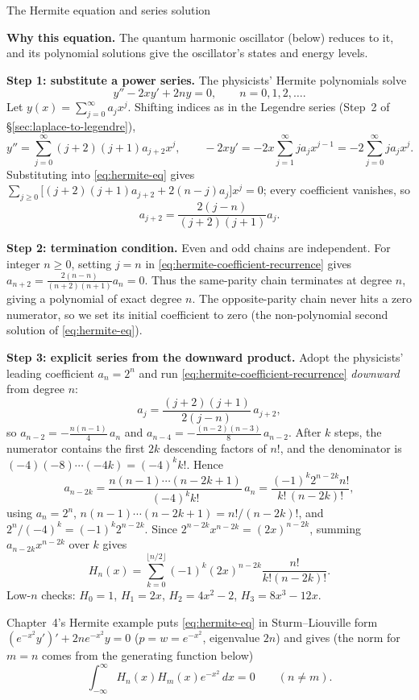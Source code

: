 \documentclass[11pt]{beamer}
\begin{document}
\begin{frame}[allowframebreaks=1.00]{The Hermite equation and series solution}
\footnotesize

\textbf{Why this equation.} The quantum harmonic oscillator (below) reduces to it,
and its polynomial solutions give the oscillator's states and energy levels.

\textbf{Step 1: substitute a power series.}  The physicists' Hermite polynomials solve
\begin{equation}
  y''-2xy'+2ny=0,
  \qquad n=0,1,2,\ldots.
  \label{eq:hermite-eq}
\end{equation}
Let $y(x)=\sum_{j=0}^{\infty}a_jx^j$.  Shifting indices as in the Legendre series (Step~2 of
\S\ref{sec:laplace-to-legendre}),
\[
  y''=\sum_{j=0}^{\infty}(j+2)(j+1)a_{j+2}x^j,
  \qquad
  -2xy'=-2x\sum_{j=1}^{\infty}ja_jx^{j-1}=-2\sum_{j=0}^{\infty}ja_jx^j .
\]
Substituting into \eqref{eq:hermite-eq} gives
$\sum_{j\ge0}\bigl[(j+2)(j+1)a_{j+2}+2(n-j)a_j\bigr]x^j=0$; every coefficient vanishes, so
\begin{equation}
  a_{j+2}=\frac{2(j-n)}{(j+2)(j+1)}a_j.
  \label{eq:hermite-coefficient-recurrence}
\end{equation}

\textbf{Step 2: termination condition.}  Even and odd chains are independent.  For integer
$n\ge0$, setting $j=n$ in \eqref{eq:hermite-coefficient-recurrence} gives
$a_{n+2}=\tfrac{2(n-n)}{(n+2)(n+1)}a_n=0$. Thus the same-parity chain terminates at degree $n$, giving a polynomial of exact degree
$n$.  The opposite-parity chain never hits a zero numerator, so we set its initial
coefficient to zero (the non-polynomial second solution of \eqref{eq:hermite-eq}).

\textbf{Step 3: explicit series from the downward product.}
Adopt the physicists' leading coefficient $a_n=2^n$ and run
\eqref{eq:hermite-coefficient-recurrence} \emph{downward} from degree $n$:
\[
  a_j=\frac{(j+2)(j+1)}{2(j-n)}\,a_{j+2},
\]
so $a_{n-2}=-\tfrac{n(n-1)}{4}\,a_n$ and $a_{n-4}=-\tfrac{(n-2)(n-3)}{8}\,a_{n-2}$. After $k$ steps, the numerator
contains the first $2k$ descending factors of $n!$, and the denominator is
$(-4)(-8)\cdots(-4k)=(-4)^k k!$. Hence
\[
 a_{n-2k}=\frac{n(n-1)\cdots(n-2k+1)}{(-4)^k k!}\,a_n
 =\frac{(-1)^k2^{n-2k}n!}{k!\,(n-2k)!},
\]
using $a_n=2^n$, $n(n-1)\cdots(n-2k+1)=n!/(n-2k)!$, and $2^n/(-4)^k=(-1)^k2^{n-2k}$.
Since $2^{n-2k}x^{n-2k}=(2x)^{n-2k}$, summing $a_{n-2k}x^{n-2k}$ over $k$ gives
\begin{equation}
  H_n(x)=\sum_{k=0}^{\lfloor n/2\rfloor}
  (-1)^k(2x)^{n-2k}\frac{n!}{k!(n-2k)!}.
  \label{eq:hermite-series}
\end{equation}
Low-$n$ checks: $H_0=1$, $H_1=2x$, $H_2=4x^2-2$, $H_3=8x^3-12x$.

Chapter~4's Hermite example puts \eqref{eq:hermite-eq} in Sturm--Liouville form
$(e^{-x^2}y')'+2ne^{-x^2}y=0$ ($p=w=e^{-x^2}$, eigenvalue $2n$) and gives
(the norm for $m=n$ comes from the generating function below)
\begin{equation}
  \int_{-\infty}^{\infty}H_n(x)H_m(x)e^{-x^2}\,dx=0\qquad(n\ne m).
  \label{eq:hermite-ortho}
\end{equation}
\end{frame}
\end{document}
